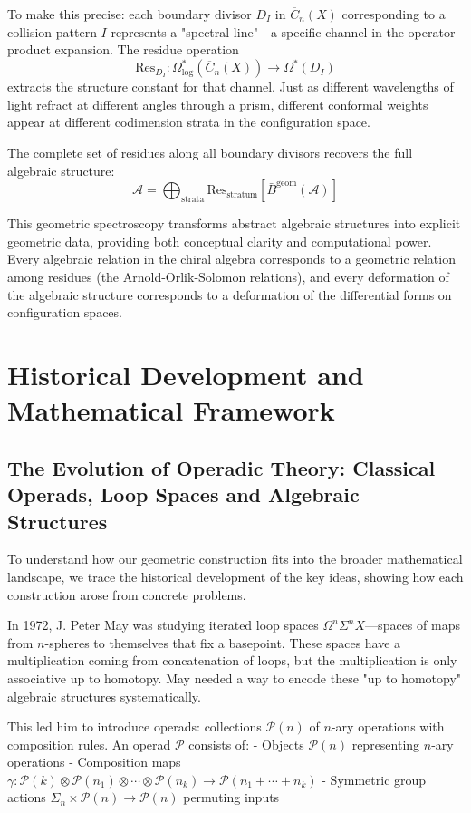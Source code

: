 To make this precise: each boundary divisor $D_I$ in $\overline{C}_n(X)$ corresponding to a collision pattern $I$ represents a "spectral line"—a specific channel in the operator product expansion. The residue operation
$$\text{Res}_{D_I}: \Omega^*_{\text{log}}(\overline{C}_n(X)) \to \Omega^*(D_I)$$
extracts the structure constant for that channel. Just as different wavelengths of light refract at different angles through a prism, different conformal weights appear at different codimension strata in the configuration space.

The complete set of residues along all boundary divisors recovers the full algebraic structure:
$$\mathcal{A} = \bigoplus_{\text{strata}} \text{Res}_{\text{stratum}}[\bar{B}^{\text{geom}}(\mathcal{A})]$$

This geometric spectroscopy transforms abstract algebraic structures into explicit geometric data, providing both conceptual clarity and computational power. Every algebraic relation in the chiral algebra corresponds to a geometric relation among residues (the Arnold-Orlik-Solomon relations), and every deformation of the algebraic structure corresponds to a deformation of the differential forms on configuration spaces.

\section{Historical Development and Mathematical Framework}

\subsection{The Evolution of Operadic Theory: Classical Operads, Loop Spaces and Algebraic Structures}

To understand how our geometric construction fits into the broader mathematical landscape, we trace the historical development of the key ideas, showing how each construction arose from concrete problems.

In 1972, J. Peter May \cite{May72} was studying iterated loop spaces $\Omega^n\Sigma^n X$—spaces of maps from $n$-spheres to themselves that fix a basepoint. These spaces have a multiplication coming from concatenation of loops, but the multiplication is only associative up to homotopy. May needed a way to encode these "up to homotopy" algebraic structures systematically.

This led him to introduce operads: collections $\mathcal{P}(n)$ of $n$-ary operations with composition rules. An operad $\mathcal{P}$ consists of:
- Objects $\mathcal{P}(n)$ representing $n$-ary operations  
- Composition maps $\gamma: \mathcal{P}(k) \otimes \mathcal{P}(n_1) \otimes \cdots \otimes \mathcal{P}(n_k) \to \mathcal{P}(n_1 + \cdots + n_k)$
- Symmetric group actions $\Sigma_n \times \mathcal{P}(n) \to \mathcal{P}(n)$ permuting inputs

